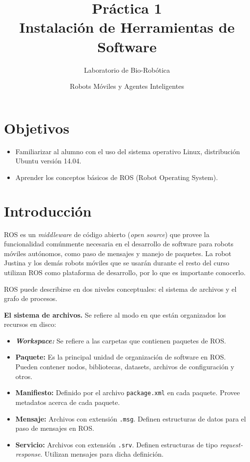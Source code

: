 \documentclass[letterpaper,12pt]{article}
\title{Práctica 1 \\ Instalación de Herramientas de Software}
\author{Laboratorio de Bio-Robótica}
\date{Robots Móviles y Agentes Inteligentes}
\begin{document}
\renewcommand{\tablename}{Tabla}
\maketitle
\section*{Objetivos}
\begin{itemize}
\item Familiarizar al alumno con el uso del sistema operativo Linux, distribución Ubuntu versión 14.04.
\item Aprender los conceptos básicos de ROS (Robot Operating System).
\end{itemize}

\section{Introducción}
ROS es un \textit{middleware} de código abierto (\textit{open source}) que provee la funcionalidad comúnmente necesaria en el desarrollo de software para robots móviles autónomos, como paso de mensajes y manejo de paquetes. La robot Justina y los demás robots móviles que se usarán durante el resto del curso utilizan ROS como plataforma de desarrollo, por lo que es importante conocerlo.

ROS puede describirse en dos niveles conceptuales: el sistema de archivos y el grafo de procesos.

\textbf{El sistema de archivos.} Se refiere al modo en que están organizados los recursos en disco:
\begin{itemize}
\item \textbf{\textit{Workspace:}} Se refiere a las carpetas que contienen paquetes de ROS.
\item \textbf{Paquete:} Es la principal unidad de organización de software en ROS. Pueden contener nodos, bibliotecas, datasets, archivos de configuración y otros.
\item \textbf{Manifiesto:} Definido por el archivo \texttt{package.xml} en cada paquete. Provee metadatos acerca de cada paquete. 
\item \textbf{Mensaje:} Archivos con extensión \texttt{.msg}. Definen estructuras de datos para el paso de mensajes en ROS.
\item \textbf{Servicio:} Archivos con extensión \texttt{.srv}. Definen estructuras de tipo \textit{request-response}. Utilizan mensajes para dicha definición.
\end{itemize}
\end{document}
